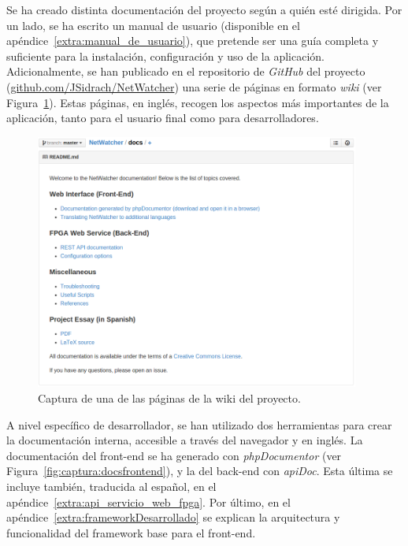 Se ha creado distinta documentación del proyecto según a quién esté dirigida.
Por un lado, se ha escrito un manual de usuario (disponible en el apéndice~\ref{extra:manual_de_usuario}), que pretende ser una guía completa y suficiente para la instalación, configuración y uso de la aplicación.
Adicionalmente, se han publicado en el repositorio de \textit{GitHub} del proyecto (\url{github.com/JSidrach/NetWatcher}) una serie de páginas en formato \textit{wiki} (ver Figura~\ref{fig:captura:wiki}).
Estas páginas, en inglés, recogen los aspectos más importantes de la aplicación, tanto para el usuario final como para desarrolladores.

\begin{figure}[!htp]
  \centering
  \includegraphics[width=0.95\textwidth,clip=true]{graphics/capturas/github_docs}
  \caption{Captura de una de las páginas de la wiki del proyecto.}
  \label{fig:captura:wiki}
\end{figure}

A nivel específico de desarrollador, se han utilizado dos herramientas para crear la documentación interna, accesible a través del navegador y en inglés.
La documentación del \gls{front-end} se ha generado con \textit{phpDocumentor} (ver Figura~\ref{fig:captura:docsfrontend}), y la del \gls{back-end} con \textit{apiDoc}.
Esta última se incluye también, traducida al español, en el apéndice~\ref{extra:api_servicio_web_fpga}.
Por último, en el apéndice~\ref{extra:frameworkDesarrollado} se explican la arquitectura y funcionalidad del \gls{framework} base para el \gls{front-end}.

